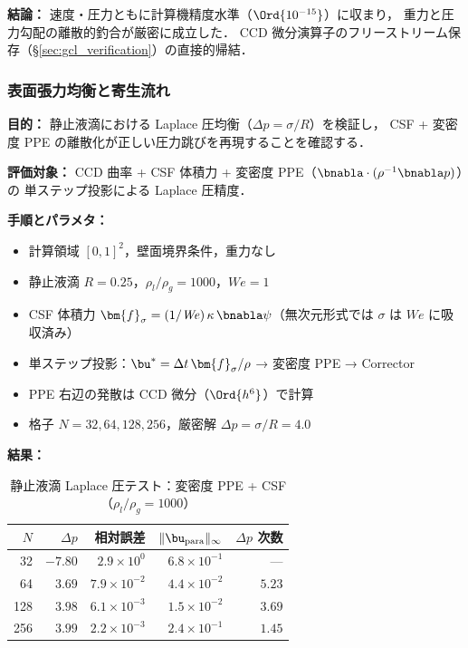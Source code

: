 \noindent\textbf{結論：}
速度・圧力ともに計算機精度水準（$\Ord{10^{-15}}$）に収まり，
重力と圧力勾配の離散的釣合が厳密に成立した．
CCD 微分演算子のフリーストリーム保存（§\ref{sec:gcl_verification}）の直接的帰結．

\subsubsection{表面張力均衡と寄生流れ}
\label{sec:bf_static_droplet}

\noindent\textbf{目的：}
静止液滴における Laplace 圧均衡（$\Delta p = \sigma/R$）を検証し，
CSF + 変密度 PPE の離散化が正しい圧力跳びを再現することを確認する．

\noindent\textbf{評価対象：}
CCD 曲率 + CSF 体積力 + 変密度 PPE（$\bnabla\cdot({\rho^{-1}}\bnabla p)$）の
単ステップ投影による Laplace 圧精度．

\noindent\textbf{手順とパラメタ：}
\begin{itemize}[noitemsep]
  \item 計算領域 $[0,1]^2$，壁面境界条件，重力なし
  \item 静止液滴 $R = 0.25$，$\rho_l/\rho_g = 1000$，$\mathit{We} = 1$
  \item CSF 体積力 $\bm{f}_\sigma = (1/\mathit{We})\,\kappa\,\bnabla\psi$（無次元形式では $\sigma$ は $We$ に吸収済み）
  \item 単ステップ投影：$\bu^* = \Delta t\,\bm{f}_\sigma / \rho$ → 変密度 PPE → Corrector
  \item PPE 右辺の発散は CCD 微分（$\Ord{h^6}$）で計算
  \item 格子 $N = 32, 64, 128, 256$，厳密解 $\Delta p = \sigma / R = 4.0$
\end{itemize}

\noindent\textbf{結果：}

\begin{table}[htbp]
\centering
\caption{静止液滴 Laplace 圧テスト：変密度 PPE + CSF（$\rho_l/\rho_g = 1000$）}
\label{tab:bf_laplace}
\renewcommand{\arraystretch}{1.3}
\begin{tabular}{rrrrr}
\toprule
$N$ & $\Delta p$ & 相対誤差 & $\|\bu_{\mathrm{para}}\|_\infty$ & $\Delta p$ 次数 \\
\midrule
 32 & $-7.80$ & $2.9 \times 10^{0}$  & $6.8 \times 10^{-1}$ & --- \\
 64 & $3.69$  & $7.9 \times 10^{-2}$ & $4.4 \times 10^{-2}$ & $5.23$ \\
128 & $3.98$  & $6.1 \times 10^{-3}$ & $1.5 \times 10^{-2}$ & $3.69$ \\
256 & $3.99$  & $2.2 \times 10^{-3}$ & $2.4 \times 10^{-1}$ & $1.45$ \\
\bottomrule
\end{tabular}
\end{table}

